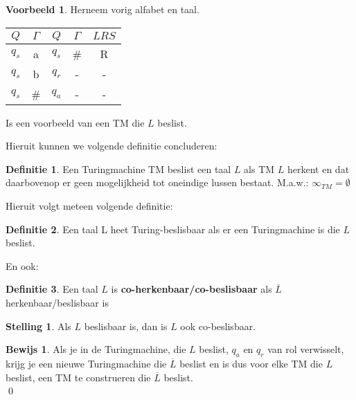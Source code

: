 \documentclass[12pt,a4paper]{article}
\theoremstyle{definition}
\newtheorem{defi}{Definitie}[section]
\newtheorem{stel}{Stelling}[section]
\newtheorem{vb}{Voorbeeld}[section]
\newtheorem{bewijs}{Bewijs}[section]
\begin{document}
	\begin{vb}
		Herneem vorig alfabet en taal.\\
		\begin{table}[H]
			\centering
			\begin{tabular}{|c|c|c|c|c|}
				\hline $Q$ & $\Gamma$ & $Q$ & $\Gamma$ & $LRS$ \\ 
				\hline $q_s$ & a & $q_s$ & \# & R \\ 
				$q_s$ & b & $q_r$ & - & - \\ 
				$q_s$ & \# & $q_a$ & - & - \\ 
				\hline
			\end{tabular} 
		\end{table}	
		Is een voorbeeld van een TM die $L$ beslist.
	\end{vb}
	Hieruit kunnen we volgende definitie concluderen:
	\begin{defi}
		Een Turingmachine TM beslist een taal $L$ als TM $L$ herkent en dat daarbovenop er geen mogelijkheid tot oneindige lussen bestaat. M.a.w.: $\infty_{TM} = \emptyset$
	\end{defi}
	Hieruit volgt meteen volgende definitie:
	\begin{defi}
		Een taal L heet Turing-beslisbaar als er een Turingmachine is die $L$ beslist.
	\end{defi}
	En ook:
	\begin{defi}
		Een taal $L$ is \textbf{co-herkenbaar/co-beslisbaar} als $\overline{L}$ herkenbaar/beslisbaar is
	\end{defi}
	\begin{stel}
		Als $L$ beslisbaar is, dan is $L$ ook co-beslisbaar.
		\begin{bewijs}
			Als je in de Turingmachine, die $L$ beslist, $q_a$ en $q_r$ van rol verwisselt, krijg je een nieuwe Turingmachine die $\overline{L}$ beslist en is dus voor elke TM die $L$ beslist, een TM te construeren die $\overline{L}$ beslist.\\ \qed
		\end{bewijs}
	\end{stel}
	\newpage
\end{document}
